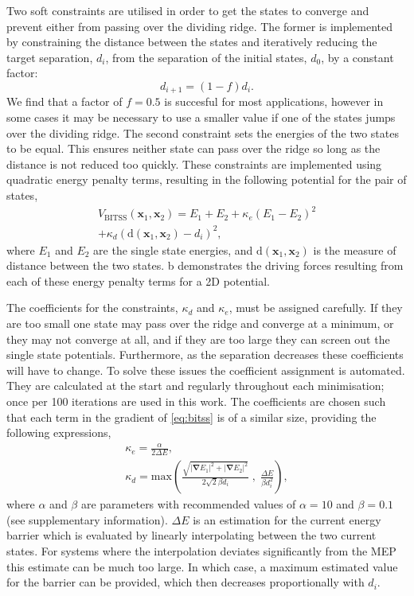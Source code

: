 \documentclass[aps,twocolumn]{revtex4}
\begin{document}
\topic Two soft constraints are utilised in order to get the states to converge and prevent either from passing over the dividing ridge.
The former is implemented by constraining the distance between the states and iteratively reducing the target separation, $d_i$, from the separation of the initial states, $d_0$, by a constant factor:
\begin{equation}
  d_{i+1} = (1 - f) d_i.
  \label{eq:diteration}
\end{equation}
We find that a factor of $f = 0.5$ is succesful for most applications, however in some cases it may be necessary to use a smaller value if one of the states jumps over the dividing ridge.
The second constraint sets the energies of the two states to be equal.
This ensures neither state can pass over the ridge so long as the distance is not reduced too quickly.
These constraints are implemented using quadratic energy penalty terms, resulting in the following potential for the pair of states,
\begin{multline}
  V_\text{BITSS}(\bm{x}_1, \bm{x}_2) = E_1 + E_2
    + \kappa_e \left( E_1 - E_2 \right) ^2 \\
    + \kappa_d \left( \mathrm{d}(\bm{x}_1, \bm{x}_2) - d_i \right) ^2,
  \label{eq:bitss}
\end{multline}
where $E_1$ and $E_2$ are the single state energies, and $\mathrm{d}(\bm{x}_1, \bm{x}_2)$ is the measure of distance between the two states.
b demonstrates the driving forces resulting from each of these energy penalty terms for a 2D potential.

\topic The coefficients for the constraints, $\kappa_d$ and $\kappa_e$, must be assigned carefully.
If they are too small one state may pass over the ridge and converge at a minimum, or they may not converge at all, and if they are too large they can screen out the single state potentials.
Furthermore, as the separation decreases these coefficients will have to change.
To solve these issues the coefficient assignment is automated.
They are calculated at the start and regularly throughout each minimisation; once per 100 iterations are used in this work.
The coefficients are chosen such that each term in the gradient of \cref{eq:bitss} is of a similar size, providing the following expressions,
\begin{gather}
  \kappa_e = \frac {\alpha} {2 \Delta E},
  \label{eq:ke}
  \\
  \kappa_d = \text{max} \left(
    \frac {\sqrt{|\bm{\nabla} E_1|^2 + |\bm{\nabla} E_2|^2}} {2\sqrt{2} \beta d_i} \; , \;
    \frac{\Delta E}{\beta d_i^2} \right),
  \label{eq:kd}
\end{gather}
where $\alpha$ and $\beta$ are parameters with recommended values of $\alpha = 10$ and $\beta = 0.1$ (see supplementary information).
$\Delta E$ is an estimation for the current energy barrier which is evaluated by linearly interpolating between the two current states.
For systems where the interpolation deviates significantly from the MEP this estimate can be much too large.
In which case, a maximum estimated value for the barrier can be provided, which then decreases proportionally with $d_i$.
\end{document}
